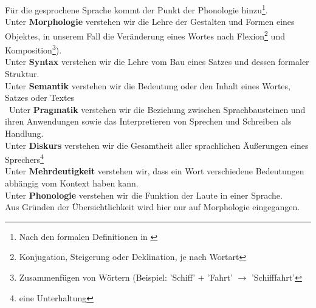 \documentclass[12pt,twoside]{article}
\theoremstyle{plain}
\theoremstyle{definition}
\theoremstyle{remark}
\begin{document}
Für die gesprochene Sprache kommt der Punkt der Phonologie hinzu\footnote{Nach den formalen Definitionen in \cite{duden}}.\\
Unter \textbf{Morphologie} verstehen wir die Lehre der Gestalten und Formen eines Objektes, in unserem Fall die Veränderung eines Wortes nach Flexion\footnote{Konjugation, Steigerung oder Deklination, je nach Wortart} und Komposition\footnote{Zusammenfügen von Wörtern (Beispiel: 'Schiff' + 'Fahrt' $\longrightarrow$ 'Schifffahrt'}). \\
Unter \textbf{Syntax} verstehen wir die Lehre vom Bau eines Satzes und dessen formaler Struktur.\\
Unter \textbf{Semantik} verstehen wir die Bedeutung oder den Inhalt eines Wortes, Satzes oder Textes\\\
Unter \textbf{Pragmatik} verstehen wir die Beziehung zwischen Sprachbausteinen und ihren Anwendungen sowie das Interpretieren von Sprechen und Schreiben als Handlung.\\
Unter \textbf{Diskurs} verstehen wir die Gesamtheit aller sprachlichen Äußerungen eines Sprechers\footnote{eine Unterhaltung}\\
Unter \textbf{Mehrdeutigkeit} verstehen wir, dass ein Wort verschiedene Bedeutungen abhängig vom Kontext haben kann.\\
Unter \textbf{Phonologie} verstehen wir die Funktion der Laute in einer Sprache.\\
Aus Gründen der Übersichtlichkeit wird hier nur auf Morphologie eingegangen.
\end{document}
